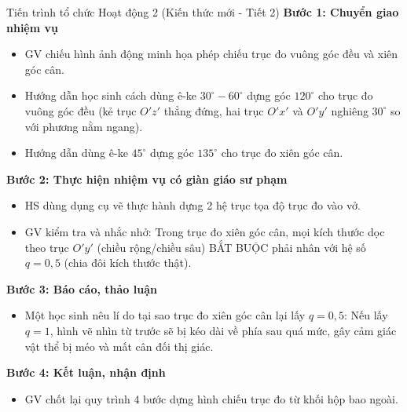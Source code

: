 \documentclass[12pt, a4paper]{article}
\begin{document}
\begin{pedabox}{Tiến trình tổ chức Hoạt động 2 (Kiến thức mới - Tiết 2)}
    \textbf{Bước 1: Chuyển giao nhiệm vụ}
    \begin{itemize}[leftmargin=0.6cm]
        \item GV chiếu hình ảnh động minh họa phép chiếu trục đo vuông góc đều và xiên góc cân.
        \item Hướng dẫn học sinh cách dùng ê-ke $30^\circ - 60^\circ$ dựng góc $120^\circ$ cho trục đo vuông góc đều (kẻ trục $O'z'$ thẳng đứng, hai trục $O'x'$ và $O'y'$ nghiêng $30^\circ$ so với phương nằm ngang).
        \item Hướng dẫn dùng ê-ke $45^\circ$ dựng góc $135^\circ$ cho trục đo xiên góc cân.
    \end{itemize}

    \textbf{Bước 2: Thực hiện nhiệm vụ có giàn giáo sư phạm}
    \begin{itemize}[leftmargin=0.6cm]
        \item HS dùng dụng cụ vẽ thực hành dựng 2 hệ trục tọa độ trục đo vào vở.
        \item GV kiểm tra và nhắc nhở: Trong trục đo xiên góc cân, mọi kích thước dọc theo trục $O'y'$ (chiều rộng/chiều sâu) BẮT BUỘC phải nhân với hệ số $q = 0{,}5$ (chia đôi kích thước thật).
    \end{itemize}

    \textbf{Bước 3: Báo cáo, thảo luận}
    \begin{itemize}[leftmargin=0.6cm]
        \item Một học sinh nêu lí do tại sao trục đo xiên góc cân lại lấy $q = 0{,}5$: Nếu lấy $q = 1$, hình vẽ nhìn từ trước sẽ bị kéo dài về phía sau quá mức, gây cảm giác vật thể bị méo và mất cân đối thị giác.
    \end{itemize}

    \textbf{Bước 4: Kết luận, nhận định}
    \begin{itemize}[leftmargin=0.6cm]
        \item GV chốt lại quy trình 4 bước dựng hình chiếu trục đo từ khối hộp bao ngoài.
    \end{itemize}
\end{pedabox}
\end{document}
